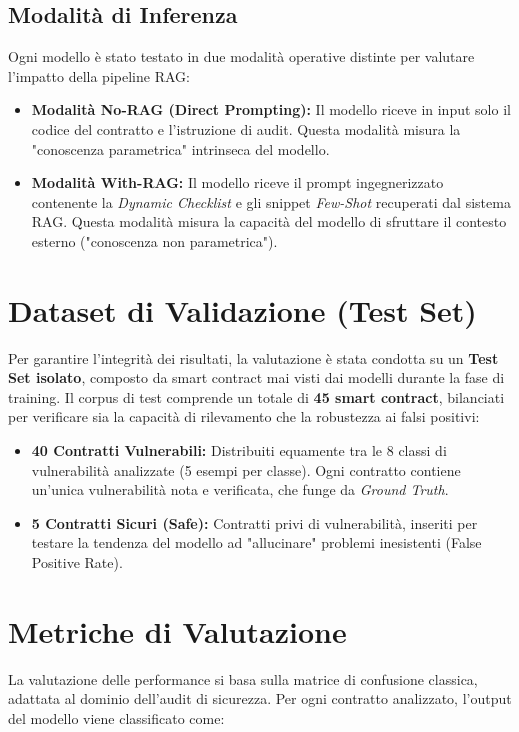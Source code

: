 \subsection{Modalità di Inferenza}
Ogni modello è stato testato in due modalità operative distinte per valutare l'impatto della pipeline RAG:

\begin{itemize}
    \item \textbf{Modalità No-RAG (Direct Prompting):} Il modello riceve in input solo il codice del contratto e l'istruzione di audit. Questa modalità misura la "conoscenza parametrica" intrinseca del modello.
    \item \textbf{Modalità With-RAG:} Il modello riceve il prompt ingegnerizzato contenente la \textit{Dynamic Checklist} e gli snippet \textit{Few-Shot} recuperati dal sistema RAG. Questa modalità misura la capacità del modello di sfruttare il contesto esterno ("conoscenza non parametrica").
\end{itemize}

\section{Dataset di Validazione (Test Set)}
Per garantire l'integrità dei risultati, la valutazione è stata condotta su un \textbf{Test Set isolato}, composto da smart contract mai visti dai modelli durante la fase di training.
Il corpus di test comprende un totale di \textbf{45 smart contract}, bilanciati per verificare sia la capacità di rilevamento che la robustezza ai falsi positivi:

\begin{itemize}
    \item \textbf{40 Contratti Vulnerabili:} Distribuiti equamente tra le 8 classi di vulnerabilità analizzate (5 esempi per classe). Ogni contratto contiene un'unica vulnerabilità nota e verificata, che funge da \textit{Ground Truth}.
    \item \textbf{5 Contratti Sicuri (Safe):} Contratti privi di vulnerabilità, inseriti per testare la tendenza del modello ad "allucinare" problemi inesistenti (False Positive Rate).
\end{itemize}

\section{Metriche di Valutazione}
\label{sec:metrics}

La valutazione delle performance si basa sulla matrice di confusione classica, adattata al dominio dell'audit di sicurezza. Per ogni contratto analizzato, l'output del modello viene classificato come:

